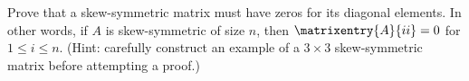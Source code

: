 Prove that a skew-symmetric matrix must have zeros for its diagonal elements.  In other words, if $A$ is skew-symmetric of size $n$, then $\matrixentry{A}{ii}=0$ for $1\leq i\leq n$.  (Hint: carefully construct an example of a $3\times 3$ skew-symmetric matrix before attempting a proof.)